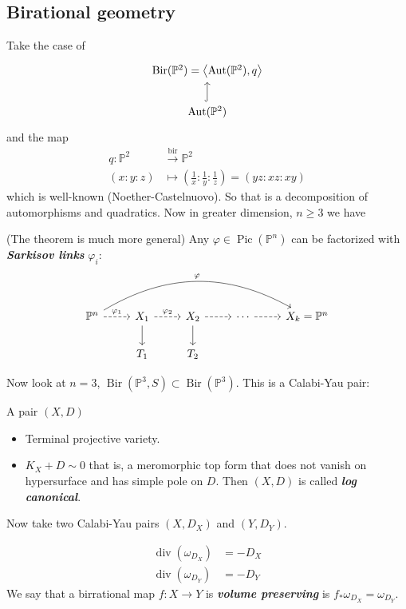 \subsection{Birational geometry}

Take the case of
\[\begin{tikzcd}
	\operatorname{Bir}(\mathbb{P}^2)=\left<\operatorname{Aut}(\mathbb{P}^2),q\right> \\
	\operatorname{Aut}(\mathbb{P}^2)\arrow[u,hook]
\end{tikzcd}\]
and the map
\begin{align*}
	q: \mathbb{P}^2 &\overset{\operatorname{bir}}{\longrightarrow}\mathbb{P}^2  \\
	(x:y:z) &\longmapsto \left(\frac{1}{x}:\frac{1}{y}:\frac{1}{z}\right)=(yz:xz:xy)
\end{align*}
which is well-known (Noether-Castelnuovo). So that is a decomposition of automorphisms and quadratics. Now in greater dimension, $n\geq 3$ we have

\begin{thm}\leavevmode
	(The theorem is much more general) Any $\varphi \in\operatorname{Pic}(\mathbb{P}^n)$ can be factorized with  \textit{\textbf{Sarkisov links}}  $\varphi_i$:
	\[\begin{tikzcd}
		\mathbb{P}^n\arrow[r,dashed,"\varphi_1"]\arrow[rrrr,bend left,"\varphi"]&X_1\arrow[r,dashed,"\varphi_2"]\arrow[d]&X_2\arrow[r,dashed]\arrow[d]&\cdots \arrow[r,dashed]&X_k=\mathbb{P}^n\\
		&T_1&T_2
	\end{tikzcd}\]
\end{thm}

Now look at $n=3$, $\operatorname{Bir}(\mathbb{P}^3,S)\subset \operatorname{Bir}(\mathbb{P}^3)$. This is a Calabi-Yau pair:

\begin{defn}\leavevmode 
	A pair $(X,D)$
	\begin{itemize}
	\item Terminal projective variety.
	\item $K_X+D\sim0$ that is, a meromorphic top form that does not vanish on hypersurface and has simple pole on $D$. Then $(X,D)$ is called \textit{\textbf{log canonical}}.
	\end{itemize}

Now take two Calabi-Yau pairs $(X,D_X)$ and  $(Y,D_Y)$.

 \begin{align*}
	\operatorname{div}(\omega_{D_X})&=-D_X\\
	\operatorname{div}(\omega_{D_Y})&=-D_Y
\end{align*}
We say that a birrational map $f:X\to Y$ is \textit{\textbf{volume preserving}} is  $f_*\omega_{D_X}=\omega_{D_Y}$.

\end{defn}


